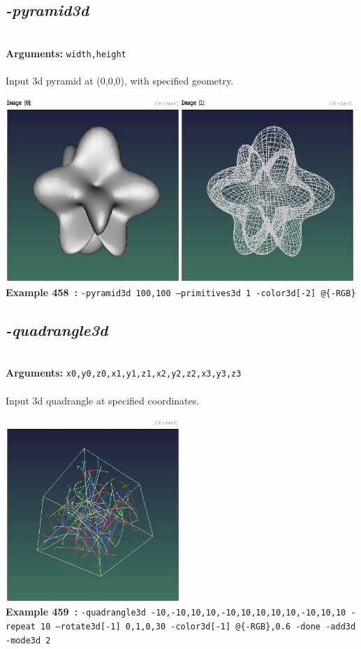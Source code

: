 \documentclass[a4paper,11pt,twoside]{book}
\begin{document}
\subsection{\emph{-pyramid3d} }\vspace*{-0.5em}
~\\\textbf{Arguments: } 
{\small \texttt{width,height}}\\~\\
Input 3d pyramid at (0,0,0), with specified geometry.
\begin{center}\includegraphics[keepaspectratio=true,height=7cm,width=\textwidth]{img/gmic_def458.jpg}\\
{\footnotesize \textbf{Example 458~:} \texttt{-pyramid3d 100,100 --primitives3d 1 -color3d[-2] @\{-RGB\}}}
\end{center}

\subsection{\emph{-quadrangle3d} }\vspace*{-0.5em}
~\\\textbf{Arguments: } 
{\small \texttt{x0,y0,z0,x1,y1,z1,x2,y2,z2,x3,y3,z3}}\\~\\
Input 3d quadrangle at specified coordinates.
\begin{center}\includegraphics[keepaspectratio=true,height=7cm,width=\textwidth]{img/gmic_def459.jpg}\\
{\footnotesize \textbf{Example 459~:} \texttt{-quadrangle3d -10,-10,10,10,-10,10,10,10,10,-10,10,10 -repeat 10 --rotate3d[-1] 0,1,0,30 -color3d[-1] @\{-RGB\},0.6 -done -add3d -mode3d 2}}
\end{center}
\end{document}
